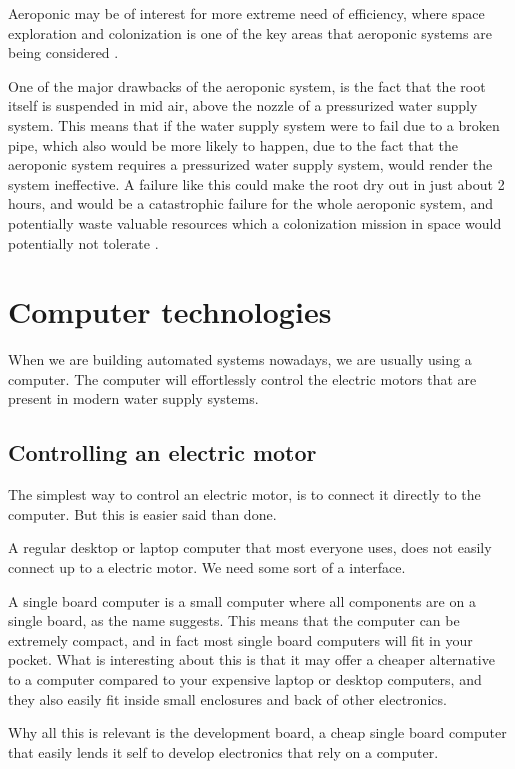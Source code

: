 \documentclass[a4paper,12pt,twoside,openright,titlepage]{book}
\begin{document}
Aeroponic may be of interest for more extreme need of efficiency, where space exploration and colonization is one of the key areas that aeroponic systems are being considered \cite{mars_agriculture}.

One of the major drawbacks of the aeroponic system, is the fact that the root itself is suspended in mid air, above the nozzle of a pressurized water supply system. This means that if the water supply system were to fail due to a broken pipe, which also would be more likely to happen, due to the fact that the aeroponic system requires a pressurized water supply system, would render the system ineffective. A failure like this could make the root dry out in just about 2 hours, and would be a catastrophic failure for the whole aeroponic system, and potentially waste valuable resources which a colonization mission in space would potentially not tolerate \cite{mars_agriculture}.

\section{Computer technologies}
When we are building automated systems nowadays, we are usually using a computer.
The computer will effortlessly control the electric motors that are present in modern water supply systems.

\subsection{Controlling an electric motor}
The simplest way to control an electric motor, is to connect it directly to the computer. But this is easier said than done.

A regular desktop or laptop computer that most everyone uses, does not easily connect up to a electric motor. We need some sort of a interface.

A single board computer is a small computer where all components are on a single board, as the name suggests.
This means that the computer can be extremely compact, and in fact most single board computers will fit in your pocket.
What is interesting about this is that it may offer a cheaper alternative to a computer compared to your expensive laptop or desktop computers, and they also easily fit inside small enclosures and back of other electronics.

Why all this is relevant is the development board, a cheap single board computer that easily lends it self to develop electronics that rely on a computer.
\end{document}
